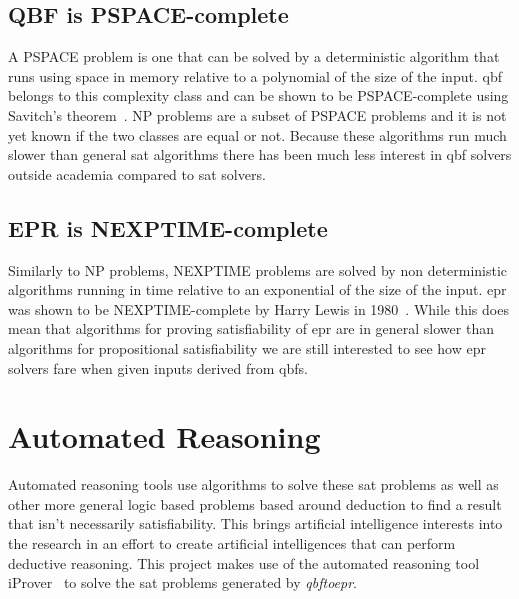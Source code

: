 \subsection{QBF is PSPACE-complete}
A PSPACE problem is one that can be solved by a deterministic algorithm that runs using space in memory relative to a polynomial of the size of the input. \Gls{qbf} belongs to this complexity class and can be shown to be PSPACE-complete using Savitch's theorem~\cite{savitch1970relationships}. NP problems are a subset of PSPACE problems and it is not yet known if the two classes are equal or not. Because these algorithms run much slower than general \gls{sat} algorithms there has been much less interest in \gls{qbf} solvers outside academia compared to \gls{sat} solvers.

\subsection{EPR is NEXPTIME-complete} \label{eprnexptime}
Similarly to NP problems, NEXPTIME problems are solved by non deterministic algorithms running in time relative to an exponential of the size of the input. \Gls{epr} was shown to be NEXPTIME-complete by Harry Lewis in 1980~\cite{lewis1980complexity}. While this does mean that algorithms for proving satisfiability of \gls{epr} are in general slower than algorithms for propositional satisfiability we are still interested to see how \gls{epr} solvers fare when given inputs derived from \glspl{qbf}.

\section{Automated Reasoning}
Automated reasoning tools use algorithms to solve these \gls{sat} problems as well as other more general logic based problems based around deduction to find a result that isn't necessarily satisfiability. This brings artificial intelligence interests into the research in an effort to create artificial intelligences that can perform deductive reasoning. This project makes use of the automated reasoning tool iProver~\cite{korovin2008iprover} to solve the \gls{sat} problems generated by \textit{qbftoepr}.
